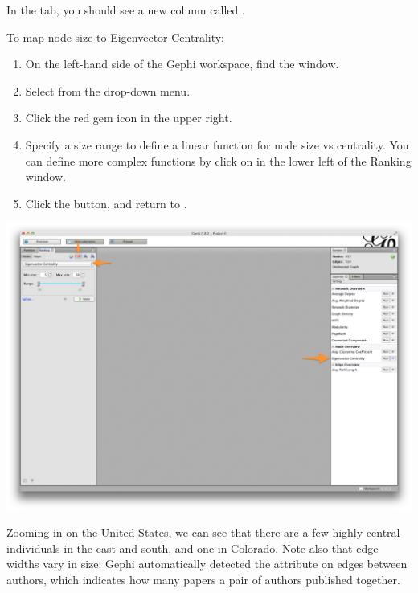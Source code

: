 \documentclass[letterpaper,10pt,english]{sphinxmanual}
\begin{document}
In the  tab, you should see a new column called .

To map node size to Eigenvector Centrality:
\begin{enumerate}
\item {} 
On the left-hand side of the Gephi workspace, find the  window.

\item {} 
Select  from the drop-down menu.

\item {} 
Click the red gem icon in the upper right.

\item {} 
Specify a size range to define a linear function for node size vs centrality. You
can define more complex functions by click on  in the lower left of
the Ranking window.

\item {} 
Click the  button, and return to .

\end{enumerate}

{\hfill\includegraphics{geo5.png}\hfill}

Zooming in on the United States, we can see that there are a few highly central
individuals in the east and south, and one in Colorado. Note also that edge widths
vary in size: Gephi automatically detected the  attribute on edges between
authors, which indicates how many papers a pair of authors published together.
\end{document}
